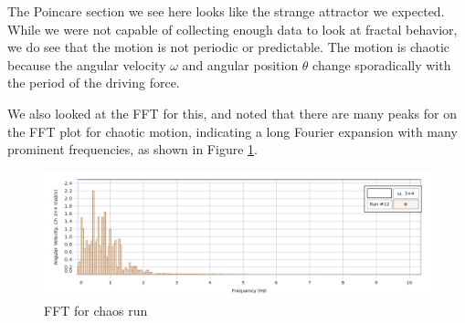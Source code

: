 \documentclass[twocolumn,amsmath,amssymb,pra, floatfix]{revtex4-2}
\begin{document}
The Poincare section we see here looks like the strange attractor we expected. While we were not capable of collecting enough data to look at fractal behavior, we do see that the motion is not periodic or predictable. The motion is chaotic because the angular velocity $\omega$ and angular position $\theta$ change sporadically with the period of the driving force. 

We also looked at the FFT for this, and noted that there are many peaks for on the FFT plot for chaotic motion, indicating a long Fourier expansion with many prominent frequencies, as shown in Figure \ref{fig: FFT chaos}. 

\begin{figure}[H]
    \centering
    \includegraphics[width = 0.7\linewidth]{images/ChaoticPlot1FFT.PNG}
    \caption{FFT for chaos run}
    \label{fig: FFT chaos}
\end{figure}
\end{document}

